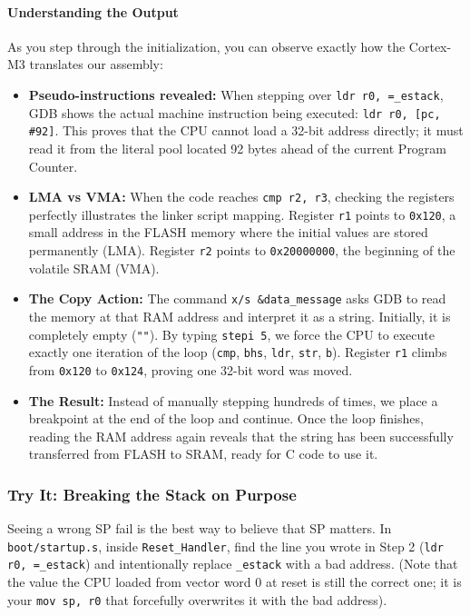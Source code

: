\paragraph{Understanding the Output}
As you step through the initialization, you can observe exactly how the Cortex-M3 translates our assembly:
\begin{itemize}
    \item \textbf{Pseudo-instructions revealed:} When stepping over \texttt{ldr r0, =\_estack}, GDB shows the actual machine instruction being executed: \texttt{ldr r0, [pc, \#92]}. This proves that the CPU cannot load a 32-bit address directly; it must read it from the literal pool located 92 bytes ahead of the current Program Counter.
    \item \textbf{LMA vs VMA:} When the code reaches \texttt{cmp r2, r3}, checking the registers perfectly illustrates the linker script mapping. Register \texttt{r1} points to \texttt{0x120}, a small address in the FLASH memory where the initial values are stored permanently (LMA). Register \texttt{r2} points to \texttt{0x20000000}, the beginning of the volatile SRAM (VMA).
    \item \textbf{The Copy Action:} The command \texttt{x/s \&data\_message} asks GDB to read the memory at that RAM address and interpret it as a string. Initially, it is completely empty (\texttt{""}). By typing \texttt{stepi 5}, we force the CPU to execute exactly one iteration of the loop (\texttt{cmp}, \texttt{bhs}, \texttt{ldr}, \texttt{str}, \texttt{b}). Register \texttt{r1} climbs from \texttt{0x120} to \texttt{0x124}, proving one 32-bit word was moved. 
    \item \textbf{The Result:} Instead of manually stepping hundreds of times, we place a breakpoint at the end of the loop and continue. Once the loop finishes, reading the RAM address again reveals that the string has been successfully transferred from FLASH to SRAM, ready for C code to use it.
\end{itemize}

\subsubsection{Try It: Breaking the Stack on Purpose}
Seeing a wrong SP fail is the best way to believe that SP matters. In \texttt{boot/startup.s}, inside \texttt{Reset\_Handler}, find the line you wrote in Step 2 (\texttt{ldr r0, =\_estack}) and intentionally replace \texttt{\_estack} with a bad address. (Note that the value the CPU loaded from vector word 0 at reset is still the correct one; it is your \texttt{mov sp, r0} that forcefully overwrites it with the bad address).

